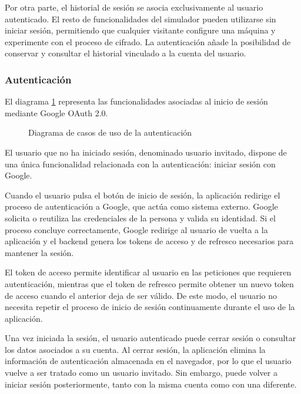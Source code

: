 Por otra parte, el historial de sesión se asocia exclusivamente al usuario autenticado. El resto de funcionalidades del simulador pueden utilizarse sin iniciar sesión, permitiendo que cualquier visitante configure una máquina y experimente con el proceso de cifrado. La autenticación añade la posibilidad de conservar y consultar el historial vinculado a la cuenta del usuario.

\subsubsection{Autenticación}

El diagrama \ref{casos_uso_autenticacion} representa las funcionalidades asociadas al inicio de sesión mediante Google OAuth 2.0.

\begin{figure}[htbp]
	\centerline{}
	\caption{Diagrama de casos de uso de la autenticación}
	\label{casos_uso_autenticacion}
\end{figure}

El usuario que no ha iniciado sesión, denominado usuario invitado, dispone de una única funcionalidad relacionada con la autenticación: iniciar sesión con Google.

Cuando el usuario pulsa el botón de inicio de sesión, la aplicación redirige el proceso de autenticación a Google, que actúa como sistema externo. Google solicita o reutiliza las credenciales de la persona y valida su identidad. Si el proceso concluye correctamente, Google redirige al usuario de vuelta a la aplicación y el backend genera los tokens de acceso y de refresco necesarios para mantener la sesión.

El token de acceso permite identificar al usuario en las peticiones que requieren autenticación, mientras que el token de refresco permite obtener un nuevo token de acceso cuando el anterior deja de ser válido. De este modo, el usuario no necesita repetir el proceso de inicio de sesión continuamente durante el uso de la aplicación.

Una vez iniciada la sesión, el usuario autenticado puede cerrar sesión o consultar los datos asociados a su cuenta. Al cerrar sesión, la aplicación elimina la información de autenticación almacenada en el navegador, por lo que el usuario vuelve a ser tratado como un usuario invitado. Sin embargo, puede volver a iniciar sesión posteriormente, tanto con la misma cuenta como con una diferente.

